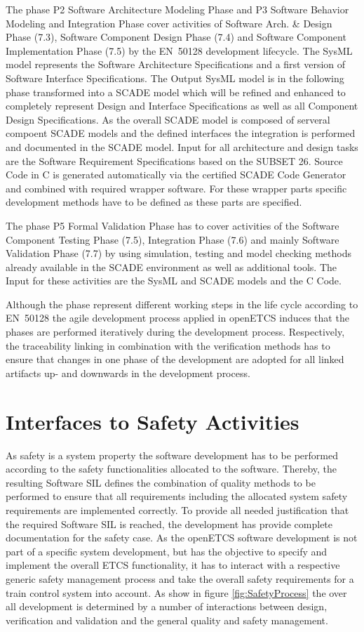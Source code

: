 \documentclass{template/openetcs_report}
\begin{document}
The phase P2 Software Architecture Modeling Phase and P3 Software Behavior Modeling and Integration Phase cover activities of Software Arch. \& Design Phase (7.3), Software Component Design Phase (7.4) and Software Component Implementation Phase (7.5) by the EN~50128 development lifecycle. The SysML model represents the Software Architecture Specifications and a first version of Software Interface Specifications. The Output SysML model is in the following phase transformed into a SCADE model which will be refined and enhanced to completely represent Design and Interface Specifications as well as all Component Design Specifications. As the overall SCADE model is composed of serveral compoent SCADE models and the defined interfaces the integration is performed and documented in the SCADE model. Input for all architecture and design tasks are the Software Requirement Specifications based on the SUBSET 26. Source Code in C is generated automatically via the certified SCADE Code Generator and combined with required wrapper software. For these wrapper parts specific development methods have to be defined as these parts are specified.

The phase P5 Formal Validation Phase has to cover activities of the Software Component Testing Phase (7.5), Integration Phase (7.6) and mainly Software Validation Phase (7.7) by using simulation, testing and model checking methods already available in the SCADE environment as well as additional tools. The Input for these activities are the SysML and SCADE models and the C Code.

Although the phase represent different working steps in the life cycle according to EN~50128 the agile development process applied in openETCS induces that the phases are performed iteratively during the development process. Respectively, the traceability linking in combination with the verification methods has to ensure that changes in one phase of the development are adopted for all linked artifacts up- and downwards in the development process.

\section{Interfaces to Safety Activities}

As safety is a system property the software development has to be performed according to the safety functionalities allocated to the software. Thereby, the resulting Software SIL defines the combination of quality methods to be performed to ensure that all requirements including the allocated system safety requirements are implemented correctly. To provide all needed justification that the required Software SIL is reached, the development has provide complete documentation for the safety case. As the openETCS software development is not part of a specific system development, but has the objective to specify and implement the overall ETCS functionality, it has to interact with a respective generic safety management process and take the overall safety requirements for a train control system into account. As show in figure \ref{fig:SafetyProcess} the over all development is determined by a number of interactions between design, verification and validation and the general quality and safety management.
\end{document}
